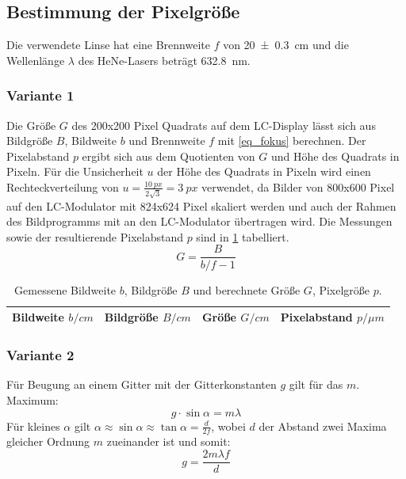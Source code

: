 \documentclass[
	a4paper,
	12pt,
	pagesize,
	ngerman
]{scrartcl}
\begin{document}
		\subsection{Bestimmung der Pixelgröße} %
		Die verwendete Linse hat eine Brennweite $f$ von \SI{20+-0.3}{cm} und die Wellenlänge $\lambda$ des HeNe-Lasers beträgt \SI{632.8}{nm}.
			\subsubsection*{Variante 1}

			Die Größe $G$ des \SI{200}{}x\SI{200}{} Pixel Quadrats auf dem LC-Display lässt sich aus Bildgröße $B$, Bildweite $b$ und Brennweite $f$ mit \cref{eq_fokus} berechnen. %
			Der Pixelabstand $p$ ergibt sich aus dem Quotienten von $G$ und Höhe des Quadrats in Pixeln.
			Für die Unsicherheit $u$ der Höhe des Quadrats in Pixeln wird einen Rechteckverteilung  von $u = \frac{\SI{10}{px}}{2\sqrt{3}}= \SI{3}{px}$ verwendet, da Bilder von 800x600 Pixel auf den LC-Modulator mit 824x624 Pixel skaliert werden und auch der Rahmen des Bildprogramms mit an den LC-Modulator übertragen wird.
			Die Messungen sowie der resultierende Pixelabstand $p$ sind in \cref{tb_pixel} tabelliert.
			\begin{equation}
				\label{eq_fokus}
				G = \frac{B}{b/f-1}
			\end{equation}

\begin{table}[H]
		\centering
		\begin{tabular}{ c | c | c | c }
			 Bildweite $b/\si{cm}$ & Bildgröße $B/\si{cm}$ & Größe $G/\si{cm}$ & Pixelabstand $p/\si{\mu m}$ \\ \hline
			 
		\end{tabular}
		\caption{
		Gemessene Bildweite $b$, Bildgröße $B$ und berechnete Größe $G$, Pixelgröße $p$.
		}
		\label{tb_pixel}
\end{table}
			\subsubsection*{Variante 2}

			Für Beugung an einem Gitter mit der Gitterkonstanten $g$ gilt für das $m$. Maximum:
			\begin{equation}
				g \cdot \sin{\alpha} = m \lambda
			\end{equation}
			Für kleines $\alpha$ gilt $\alpha\approx\sin{\alpha}\approx\tan{\alpha}=\frac{d}{2f}$, wobei $d$ der Abstand zwei Maxima gleicher Ordnung $m$  zueinander ist und somit:
			\begin{equation}
				g = \frac{2m\lambda f}{d}
			\end{equation}
\end{document}
